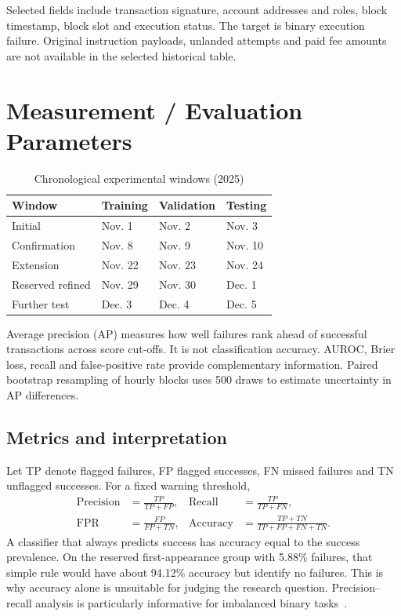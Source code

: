 \documentclass[12pt,a4paper,oneside]{report}
\begin{document}
Selected fields include transaction signature, account addresses and roles, block timestamp, block slot and execution status. The target is binary execution failure. Original instruction payloads, unlanded attempts and paid fee amounts are not available in the selected historical table.

\section{Measurement / Evaluation Parameters}
\begin{table}[H]\centering\caption{Chronological experimental windows (2025)}
\begin{tabular}{llll}\toprule Window&Training&Validation&Testing\\\midrule Initial&Nov. 1&Nov. 2&Nov. 3\\Confirmation&Nov. 8&Nov. 9&Nov. 10\\Extension&Nov. 22&Nov. 23&Nov. 24\\Reserved refined&Nov. 29&Nov. 30&Dec. 1\\Further test&Dec. 3&Dec. 4&Dec. 5\\\bottomrule\end{tabular}\end{table}
Average precision (AP) measures how well failures rank ahead of successful transactions across score cut-offs. It is not classification accuracy. AUROC, Brier loss, recall and false-positive rate provide complementary information. Paired bootstrap resampling of hourly blocks uses 500 draws to estimate uncertainty in AP differences.

\subsection{Metrics and interpretation}
Let TP denote flagged failures, FP flagged successes, FN missed failures and TN unflagged successes. For a fixed warning threshold,
\begin{align}
\mathrm{Precision}&=\frac{TP}{TP+FP}, &\mathrm{Recall}&=\frac{TP}{TP+FN},\\
\mathrm{FPR}&=\frac{FP}{FP+TN}, &\mathrm{Accuracy}&=\frac{TP+TN}{TP+FP+FN+TN}.
\end{align}
A classifier that always predicts success has accuracy equal to the success prevalence. On the reserved first-appearance group with 5.88\% failures, that simple rule would have about 94.12\% accuracy but identify no failures. This is why accuracy alone is unsuitable for judging the research question. Precision--recall analysis is particularly informative for imbalanced binary tasks~\cite{saito}.
\end{document}
